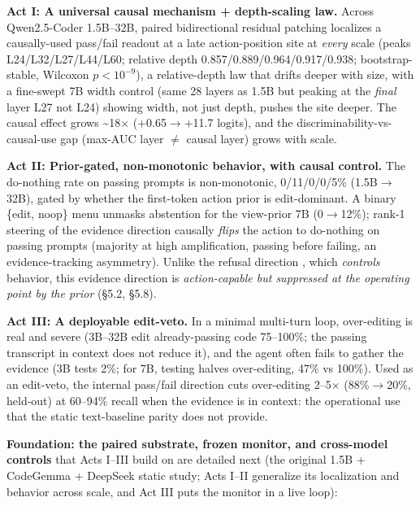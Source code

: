 \documentclass[
  11pt,
  a4paper]{article}
\begin{document}
\textbf{Act I: A universal causal mechanism + depth-scaling law.} Across
Qwen2.5-Coder 1.5B--32B, paired bidirectional residual patching
localizes a causally-used pass/fail readout at a late action-position
site at \emph{every} scale (peaks L24/L32/L27/L44/L60; relative depth
0.857/0.889/0.964/0.917/0.938; bootstrap-stable, Wilcoxon
\(p<10^{-9}\)), a relative-depth law that drifts deeper with size, with
a fine-swept 7B width control (same 28 layers as 1.5B but peaking at the
\emph{final} layer L27 not L24) showing width, not just depth, pushes
the site deeper. The causal effect grows \textasciitilde18\ensuremath{\times} (+0.65\ensuremath{\rightarrow}+11.7
logits), and the discriminability-vs-causal-use gap (max-AUC layer
\(\neq\) causal layer) grows with scale.

\textbf{Act II: Prior-gated, non-monotonic behavior, with causal
control.} The do-nothing rate on passing prompts is non-monotonic,
0/11/0/0/5\% (1.5B\ensuremath{\rightarrow}32B), gated by whether the first-token action prior
is edit-dominant. A binary \{edit, noop\} menu unmasks abstention for
the view-prior 7B (0\ensuremath{\rightarrow}12\%); rank-1 steering of the evidence direction
causally \emph{flips} the action to do-nothing on passing prompts
(majority at high amplification, passing before failing, an
evidence-tracking asymmetry). Unlike the refusal direction
\citep{arditi2024refusal}, which \emph{controls} behavior, this evidence
direction is \emph{action-capable but suppressed at the operating point
by the prior} (\S{}5.2, \S{}5.8).

\textbf{Act III: A deployable edit-veto.} In a minimal multi-turn loop,
over-editing is real and severe (3B--32B edit already-passing code
75--100\%; the passing transcript in context does not reduce it), and
the agent often fails to gather the evidence (3B tests 2\%; for 7B,
testing halves over-editing, 47\% vs 100\%). Used as an edit-veto, the
internal pass/fail direction cuts over-editing 2--5\ensuremath{\times} (88\%\ensuremath{\rightarrow}20\%,
held-out) at 60--94\% recall when the evidence is in context: the
operational use that the static text-baseline parity does not provide.

\textbf{Foundation: the paired substrate, frozen monitor, and
cross-model controls} that Acts I--III build on are detailed next (the
original 1.5B + CodeGemma + DeepSeek static study; Acts I--II generalize
its localization and behavior across scale, and Act III puts the monitor
in a live loop):
\end{document}
